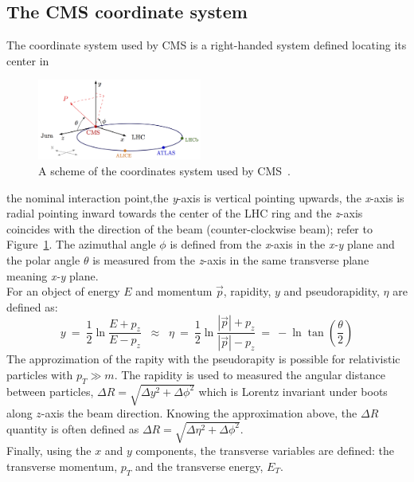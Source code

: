 \subsection{The CMS coordinate system} 
The coordinate system used by CMS is a right-handed system defined
locating its center in
\begin{figure}
  \begin{center}
    \includegraphics[clip,trim=0cm 0cm 0cm 0.1cm, width=0.48\textwidth]{Figures/c2/cms_coordinate_system.png}
  \end{center}
  \caption{A scheme of the coordinates system used by CMS~\cite{coordinate_cms}.}
\label{fig:coordinates}
\end{figure}
 the nominal interaction point,the
\emph{y}-axis is vertical pointing upwards, the \emph{x}-axis is
radial pointing inward towards the center of the LHC ring and the
\emph{z}-axis coincides with the direction of the beam
(counter-clockwise beam); refer to
Figure~\ref{fig:coordinates}. The azimuthal angle $\phi$ is defined
from the \emph{x}-axis in the \emph{x-y} plane and the polar angle
$\theta$ is measured from the \emph{z}-axis in the same transverse
plane meaning \emph{x-y} plane.\\
For an object of energy $E$ and momentum $\overrightarrow{p}$,
rapidity, $y$ and pseudorapidity, $\eta$ are defined as:
\begin{equation}
\label{eq:pseudo}
y \: = \: \frac{1}{2} \ln \frac{E + p_z}{E - p_z} \;\; \approx \;\;
\eta \: = \: \frac{1}{2} \ln \frac{|\overrightarrow{p}| +
  p_z}{|\overrightarrow{p}| - p_z} \: = \: -\ln \tan (\frac{\theta}{2})
\end{equation}
The approzimation of the rapity with the pseudorapity is possible for
relativistic particles with $p_{T} \gg m$. The rapidity is used to
measured the angular distance between particles, $\Delta R =
\sqrt{\Delta y ^2 + \Delta \phi ^2}$ which is Lorentz invariant under
boots along $z$-axis the beam direction. Knowing the approximation above,
the $\Delta R$ quantity is often defined as $\Delta R =
\sqrt{\Delta \eta ^2 + \Delta \phi ^2}$.\\
Finally, using the $x$ and $y$ components, the transverse variables
are defined: the transverse momentum, $p_T$ and the transverse energy,
$E_T$.


